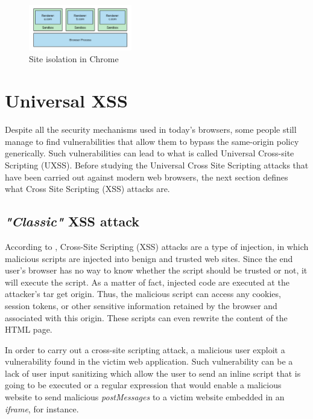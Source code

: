\documentclass[journal]{IEEEtran}
\begin{document}
\begin{figure}[h]
\centering
\includegraphics[width=0.4\textwidth]{images/IsolationChrome.png}
\caption{Site isolation in Chrome}
\label{fig:ChromeIsolation}
\end{figure}

\section{Universal XSS}

Despite all the security mechanisms used in today's browsers, some people still manage to find vulnerabilities that allow them to bypass the same-origin policy generically. Such vulnerabilities can lead to what is called Universal Cross-site Scripting (UXSS).
Before studying the Universal Cross Site Scripting attacks that have been carried out against modern web browsers, the next section defines what Cross Site Scripting (XSS) attacks are.

\subsection{\emph{"Classic"} XSS attack}

According to \cite{owaspXSS}, Cross-Site Scripting (XSS) attacks are a type of injection, in which malicious scripts are injected into benign and trusted web sites.
Since the end user’s browser has no way to know whether the script should be trusted or not, it will execute the script. As a matter of fact, injected code are executed at the attacker’s tar get origin. Thus, the malicious script can access any cookies, session tokens, or other sensitive information retained by the browser and associated with this origin. These scripts can even rewrite the content of the HTML page.

\bigskip


\bigskip

In order to carry out a cross-site scripting attack, a malicious user exploit a vulnerability found in the victim web application. Such vulnerability can be a lack of user input sanitizing which allow the user to send an inline script that is going to be executed or a regular expression that would enable a malicious website to send malicious \emph{postMessages}  \cite{postMessagesXSS} to a victim website embedded in an \emph{iframe}, for instance. 
\end{document}
